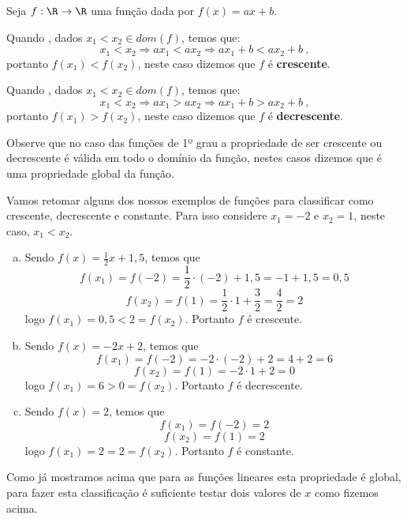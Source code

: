  \begin{exem}
 Seja $f: \R \to \R$ uma função dada por $f(x)= ax + b$.

 Quando , dados $x_1 < x_2 \in dom(f)$, temos que:
\begin{equation}
x_1 < x_2 \Rightarrow ax_1 < ax_2 \Rightarrow ax_1 + b < ax_2 + b \ ,
\end{equation}
  portanto $f(x_1) < f(x_2)$, neste caso dizemos que $f$ é \textbf{crescente}.

 Quando , dados $x_1 < x_2 \in dom(f)$, temos que:
\begin{equation}
x_1 < x_2 \Rightarrow ax_1 > ax_2 \Rightarrow ax_1 + b > ax_2 + b \ ,
\end{equation}
 portanto $f(x_1) > f(x_2)$, neste caso dizemos que $f$ é \textbf{decrescente}.

 Observe que no caso das funções de 1º grau a propriedade de ser crescente ou decrescente é válida em todo o domínio da função, nestes casos dizemos que é uma propriedade global da função.
 \end{exem}

 \begin{exem}
 Vamos retomar alguns dos nossos exemplos de funções para classificar como crescente, decrescente e constante. Para isso considere $x_1= -2$ e $x_2= 1$, neste caso, $x_1 < x_2$.
  \begin{enumerate}[a)]
   \item Sendo $f(x)= \frac{1}{2}x + 1,5$, temos que
\begin{equation}
f(x_1)= f(-2)= \frac{1}{2}\cdot (-2) + 1,5= -1 + 1,5= 0,5
\end{equation}
\begin{equation}
f(x_2)= f(1)= \frac{1}{2} \cdot 1+\frac{3}{2}= \frac{4}{2}= 2
\end{equation}
   logo $f(x_1)= 0,5 < 2= f(x_2)$. Portanto $f$ é crescente.
   \item Sendo $f(x)= -2x + 2$, temos que
\begin{equation}
f(x_1)= f(-2)= -2 \cdot (-2) + 2= 4 + 2= 6
\end{equation}
\begin{equation}
f(x_2)= f(1)= -2 \cdot 1 + 2= 0
\end{equation}
   logo $f(x_1)= 6 > 0 = f(x_2)$. Portanto $f$ é decrescente.
   \item Sendo $f(x)= 2$, temos que
\begin{equation}
f(x_1)= f(-2)= 2
\end{equation}
\begin{equation}
f(x_2)= f(1)= 2
\end{equation}
   logo $f(x_1)= 2 = 2= f(x_2)$. Portanto $f$ é constante.
  \end{enumerate}
  Como já mostramos acima que para as funções lineares esta propriedade é global, para fazer esta classificação é suficiente testar dois valores de $x$ como fizemos acima.

 \end{exem}
 
